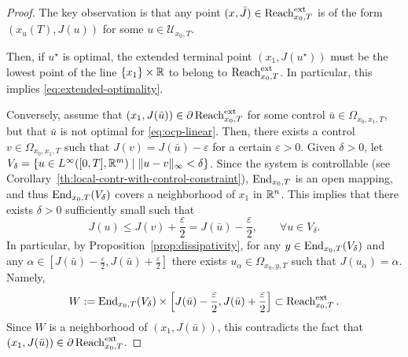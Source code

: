 
\begin{proof}
    The key observation is that any point $(x,\bar J)\in \operatorname{Reach}^{\text{ext}}_{x_0,T}$ is of the form $(x_u(T), J(u))$ for some $u\in \mathcal U_{x_0,T}$.

    Then, if $u^\star$ is optimal, the extended terminal point $(x_1,J(u^\star))$ must be the lowest point of the line $\{x_1\}\times \mathbb{R}$ to belong to $\operatorname{Reach}^{\text{ext}}_{x_0,T}$. In particular, this implies \eqref{eq:extended-optimality}.
    
    Conversely, assume that $(x_1,J(\bar u))\in \partial \operatorname{Reach}^{\text{ext}}_{x_0,T}$ for some control $\bar u\in \Omega_{x_0,x_1,T}$, but that $\bar u$ is not optimal for \eqref{eq:ocp-linear}.
    Then, there exists a control $v\in \Omega_{x_0,x_1,T}$ such that $J(v)=J(\bar u)-\varepsilon$ for a certain $\varepsilon>0$.
% 
    Given $\delta>0$, let $V_\delta = \{ u \in L^\infty([0,T],\mathbb{R}^m)\mid \|u-v\|_\infty<\delta\}$. 
    Since the system is controllable (see Corollary~\ref{th:local-contr-with-control-constraint}), $\operatorname{End}_{x_0,T}$ is an open mapping, and thus $\operatorname{End}_{x_0,T}(V_\delta)$ covers a neighborhood of $x_1$ in $\mathbb{R}^n$.
    This implies that there exists $\delta>0$ sufficiently small such that 
    \begin{equation}
        J(u) \le J(v)+\frac\varepsilon2 = J(\bar u)-\frac{\varepsilon}2, \qquad \forall u\in V_\delta.
    \end{equation}
    In particular, by Proposition~\ref{prop:dissipativity}, for any $y\in \operatorname{End}_{x_0,T}(V_\delta)$ and any $\alpha\in [J(\bar u)-\frac{\varepsilon}2,J(\bar u)+\frac{\varepsilon}2]$ there exists $u_\alpha\in \Omega_{x_0,y,T}$ such that $J(u_\alpha) = \alpha$. Namely,
    \begin{equation}
       W:=  \operatorname{End}_{x_0,T}(V_\delta)\times \left[J(\bar u)-\frac{\varepsilon}2,J(\bar u)+\frac{\varepsilon}2\right] \subset \operatorname{Reach}^{\text{ext}}_{x_0,T}.
    \end{equation}
    Since $W$ is a neighborhood of $(x_1,J(\bar u))$, this contradicts the fact that $(x_1,J(\bar u))\in \partial \operatorname{Reach}^{\text{ext}}_{x_0,T}$.
\end{proof}

